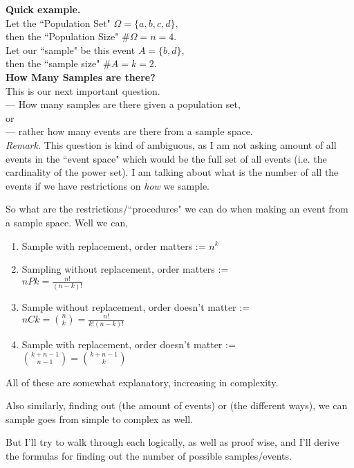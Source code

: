\documentclass[12pt]{book}
\begin{document}
\noindent \textbf{Quick example.}\\
Let the ``Population Set" $\Omega=\{a,b,c,d\}$,\\
then the ``Population Size" $\# \Omega = n = 4$.\\

\noindent Let our ``sample" be this event $A = \{b,d\}$,\\
then the ``sample size" $\# A = k = 2$.\\

\noindent \textbf{How Many Samples are there?}\\
This is our next important question. \\
--- How many samples are there given a population set, \\
or \\
--- rather how many events are there from a sample space.\\

\noindent \textit{Remark.} This question is kind of ambiguous, as I am not asking amount of all events in the ``event space" which would be the full set of all events (i.e. the cardinality of the power set). I am talking about what is the number of all the events if we have restrictions on \textit{how} we sample. 

So what are the restrictions/``procedures" we can do when making an event from a sample space. Well we can,
\begin{enumerate}
\item Sample with replacement, order matters := $n^k$
\item Sampling without replacement, order matters := \\$nPk = \frac{n!}{(n-k)!}$
\item Sample without replacement, order doesn't matter := $nCk = {n \choose k} = \frac{n!}{k!(n-k)!}$
\item Sample with replacement, order doesn't matter := \\${k+n-1 \choose n-1}={k+n-1 \choose k}$ 
\end{enumerate}

All of these are somewhat explanatory, increasing in complexity.

Also similarly, finding out (the amount of events) or (the different ways), we can sample goes from simple to complex as well.

But I'll try to walk through each logically, as well as proof wise, and I'll derive the formulas for finding out the number of possible samples/events.
\end{document}
